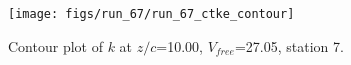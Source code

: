 \begin{figure}[H]
\centering
\texttt{[image: figs/run\_67/run\_67\_ctke\_contour]}
\caption{Contour plot of $k$ at $z/c$=10.00, $V_{free}$=27.05, station 7.}
\label{fig:run_67_ctke_contour}
\end{figure}


